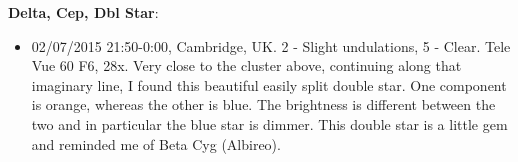 {\bf Delta, Cep, Dbl Star}:
\begin{itemize}
\item 02/07/2015 21:50-0:00, Cambridge, UK. 2 - Slight undulations, 5 - Clear. Tele Vue 60 F6, 28x. Very close to the cluster above, continuing along that imaginary line, I found this beautiful easily split double star. One component is orange, whereas the other is blue. The brightness is different between the two and in particular the blue star is dimmer. This double star is a little gem and reminded me of Beta Cyg (Albireo).
\end{itemize}
